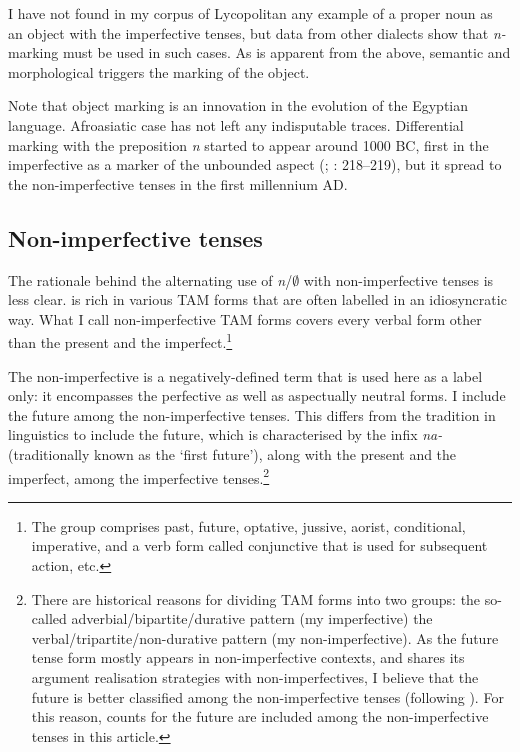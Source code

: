 \documentclass[output=paper]{LSP/langsci}
\begin{document}
I have not found in my corpus of Lycopolitan  any example of a proper noun as an object with the imperfective tenses, but data from other dialects show that \textit{n-}marking must be used in such cases. As is apparent from the above, semantic and morphological  triggers the marking of the object. 

Note that object marking is an innovation in the evolution of the Egyptian language. Afroasiatic case has not left any indisputable traces. Differential marking with the preposition \textit{n} started to appear around 1000 BC, first in the imperfective as a marker of the unbounded aspect (\citealt{Winand2015Expression}; \cf \citealt{Engsheden2006Koptischen}: 218–219), but it spread to the non-imperfective tenses in the first millennium AD.

\subsection{Non-imperfective tenses}
\label{06-en-sec:2-2}

The rationale behind the alternating use of \textit{n}/${\emptyset}$ with non-imperfective tenses is less clear.  is rich in various TAM forms that are often labelled in an idiosyncratic way. What I call non-imperfective TAM forms covers every verbal form other than the present and the imperfect.\footnote{The group comprises past, future, optative, jussive, aorist, conditional, imperative, and a verb form called conjunctive that is used for subsequent action, etc.} 

The non-imperfective is a negatively-defined term that is used here as a label only: it encompasses the perfective as well as aspectually neutral forms. I include the future among the non-imperfective tenses. This differs from the tradition in  linguistics to include the future, which is characterised by the infix \textit{na-} (traditionally known as the ‘first future’), along with the present and the imperfect, among the imperfective tenses.\footnote{There are historical reasons for dividing  TAM forms into two groups: the so-called adverbial/bipartite/durative pattern (\ie my imperfective) \vs the verbal/tripartite/non-durative pattern (my non-imperfective). As the future tense form mostly appears in non-imperfective contexts, and shares its argument realisation strategies with non-imperfectives, I believe that the  future is better classified among the non-imperfective tenses (following \citealt{Alvarez2001futuro}). For this reason, counts for the future are included among the non-imperfective tenses in this article.} 
\end{document}
